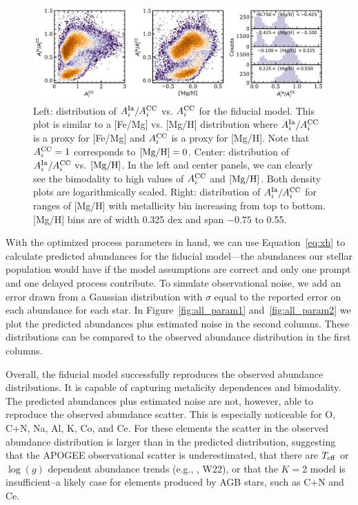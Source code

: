 \documentclass[modern, linenumbers]{aastex631}
\newcommand{\mgh}{[{\rm Mg}/{\rm H}]}
\newcommand{\logg}{\log(g)}
\newcommand{\teff}{T_{\rm eff}}
\newcommand{\Acc}{A^{\rm CC}_{i}}
\newcommand{\AIa}{A^{\rm Ia}_{i}}
\begin{document}
\begin{figure}[htb!]
    \centering
    \includegraphics[width=\textwidth]{Paper/Figures/As.pdf}
    \caption{Left: distribution of $\AIa/\Acc$ vs. $\Acc$ for the fiducial model. This plot is similar to a [Fe/Mg] vs. [Mg/H] distribution where $\AIa/\Acc$ is a proxy for [Fe/Mg] and $\Acc$ is a proxy for [Mg/H]. Note that $\Acc = 1$ corresponds to $\mgh = 0$. Center: distribution of $\AIa/\Acc$ vs. $\mgh$. In the left and center panels, we can clearly see the bimodality to high values of $\Acc$ and $\mgh$. Both density plots are logarithmically scaled. Right: distribution of $\AIa/\Acc$ for ranges of [Mg/H] with metallicity bin increasing from top to bottom. [Mg/H] bins are of width 0.325 dex and span $-0.75$ to 0.55.}
    \label{fig:As}
\end{figure}

With the optimized process parameters in hand, we can use Equation~\ref{eq:xh} to calculate predicted abundances for the fiducial model---the abundances our stellar population would have if the model assumptions are correct and only one prompt and one delayed process contribute. To simulate observational noise, we add an error drawn from a Gaussian distribution with $\sigma$ equal to the reported error on each abundance for each star. In Figure~\ref{fig:all_param1} and~\ref{fig:all_param2} we plot the predicted abundances plus estimated noise in the second columns. These distributions can be compared to the observed abundance distribution in the first columns.

Overall, the fiducial model successfully reproduces the observed abundance distributions. It is capable of capturing metalicity dependences and bimodality. The predicted abundances plus estimated noise are not, however, able to reproduce the observed abundance scatter. This is especially noticeable for O, C+N, Na, Al, K, Co, and Ce. For these elements the scatter in the observed abundance distribution is larger than in the predicted distribution, suggesting that the APOGEE observational scatter is underestimated, that there are $\teff$ or $\logg$ dependent abundance trends (e.g., \citealp{griffith2021a}, W22), or that the $K=2$ model is insufficient--a likely case for elements produced by AGB stars, such as C+N and Ce.
\end{document}
